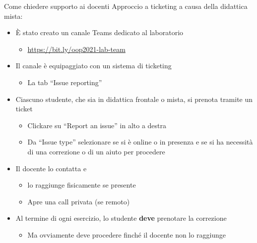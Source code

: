 \documentclass[xcolor=dvipsnames,presentation]{beamer}
\begin{document}
\begin{frame}{Come chiedere supporto ai docenti}
    Approccio a ticketing a causa della didattica mista:
    \begin{itemize}
        \item È stato creato un canale Teams dedicato al laboratorio
        \begin{itemize}
            \item \url{https://bit.ly/oop2021-lab-team}
        \end{itemize}
        \item Il canale è equipaggiato con un sistema di ticketing
        \begin{itemize}
            \item La tab ``Issue reporting''
        \end{itemize}
        \item Ciascuno studente, che sia in didattica frontale o mista, si prenota tramite un ticket
        \begin{itemize}
            \item Clickare su ``Report an issue'' in alto a destra
            \item Da ``Issue type'' selezionare se si è online o in presenza e se si ha necessità di una correzione o di un aiuto per procedere
        \end{itemize}
        \item Il docente lo contatta e
        \begin{itemize}
            \item lo raggiunge fisicamente se presente
            \item Apre una call privata (se remoto)
        \end{itemize}
        \item Al termine di ogni esercizio, lo studente \textbf{deve} prenotare la correzione
        \begin{itemize}
            \item Ma ovviamente deve procedere finché il docente non lo raggiunge
        \end{itemize}
    \end{itemize}
\end{frame}
\end{document}
